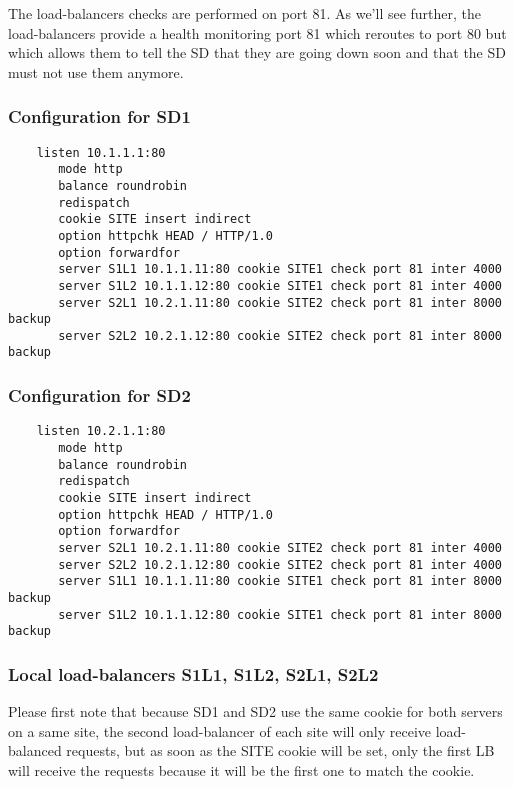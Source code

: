 The load-balancers checks are performed on port 81. As we'll see further,
the load-balancers provide a health monitoring port 81 which reroutes to
port 80 but which allows them to tell the SD that they are going down soon
and that the SD must not use them anymore.


\subsubsection{Configuration for SD1}

\begin{verbatim}
    listen 10.1.1.1:80
       mode http
       balance roundrobin
       redispatch
       cookie SITE insert indirect
       option httpchk HEAD / HTTP/1.0
       option forwardfor
       server S1L1 10.1.1.11:80 cookie SITE1 check port 81 inter 4000
       server S1L2 10.1.1.12:80 cookie SITE1 check port 81 inter 4000
       server S2L1 10.2.1.11:80 cookie SITE2 check port 81 inter 8000 backup
       server S2L2 10.2.1.12:80 cookie SITE2 check port 81 inter 8000 backup
\end{verbatim}

\subsubsection{Configuration for SD2}

\begin{verbatim}
    listen 10.2.1.1:80
       mode http
       balance roundrobin
       redispatch
       cookie SITE insert indirect
       option httpchk HEAD / HTTP/1.0
       option forwardfor
       server S2L1 10.2.1.11:80 cookie SITE2 check port 81 inter 4000
       server S2L2 10.2.1.12:80 cookie SITE2 check port 81 inter 4000
       server S1L1 10.1.1.11:80 cookie SITE1 check port 81 inter 8000 backup
       server S1L2 10.1.1.12:80 cookie SITE1 check port 81 inter 8000 backup
\end{verbatim}

\subsubsection{Local load-balancers S1L1, S1L2, S2L1, S2L2}

Please first note that because SD1 and SD2 use the same cookie for both
servers on a same site, the second load-balancer of each site will only
receive load-balanced requests, but as soon as the SITE cookie will be
set, only the first LB will receive the requests because it will be the
first one to match the cookie.

